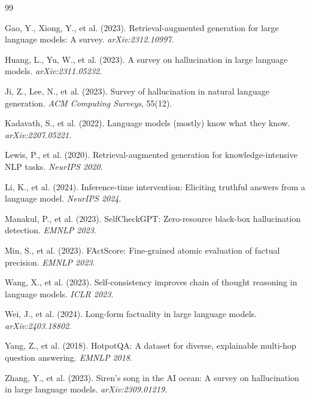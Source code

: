 \documentclass[11pt,a4paper]{article}
\begin{document}

\begin{thebibliography}{99}

Gao, Y., Xiong, Y., et al. (2023). Retrieval-augmented generation for large language models: A survey. \textit{arXiv:2312.10997}.

Huang, L., Yu, W., et al. (2023). A survey on hallucination in large language models. \textit{arXiv:2311.05232}.

Ji, Z., Lee, N., et al. (2023). Survey of hallucination in natural language generation. \textit{ACM Computing Surveys}, 55(12).

Kadavath, S., et al. (2022). Language models (mostly) know what they know. \textit{arXiv:2207.05221}.

Lewis, P., et al. (2020). Retrieval-augmented generation for knowledge-intensive NLP tasks. \textit{NeurIPS 2020}.

Li, K., et al. (2024). Inference-time intervention: Eliciting truthful answers from a language model. \textit{NeurIPS 2024}.

Manakul, P., et al. (2023). SelfCheckGPT: Zero-resource black-box hallucination detection. \textit{EMNLP 2023}.

Min, S., et al. (2023). FActScore: Fine-grained atomic evaluation of factual precision. \textit{EMNLP 2023}.

Wang, X., et al. (2023). Self-consistency improves chain of thought reasoning in language models. \textit{ICLR 2023}.

Wei, J., et al. (2024). Long-form factuality in large language models. \textit{arXiv:2403.18802}.

Yang, Z., et al. (2018). HotpotQA: A dataset for diverse, explainable multi-hop question answering. \textit{EMNLP 2018}.

Zhang, Y., et al. (2023). Siren's song in the AI ocean: A survey on hallucination in large language models. \textit{arXiv:2309.01219}.

\end{thebibliography}
\end{document}

